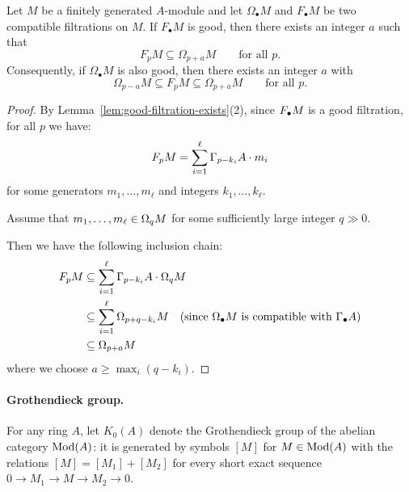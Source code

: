 \begin{corollary}\label{cor:compare-good-filtrations}
    Let $M$ be a finitely generated $A$-module and let $\Omega_\bullet M$ and $F_\bullet M$
    be two compatible filtrations on $M$.
    If $F_\bullet M$ is good, then there exists an integer $a$ such that
    \[
        F_pM \subseteq \Omega_{p+a}M \qquad \text{for all } p.
    \]
    Consequently, if $\Omega_\bullet M$ is also good, then there exists an integer $a$ with
    \[
        \Omega_{p-a}M \subseteq F_pM \subseteq \Omega_{p+a}M \qquad \text{for all } p.
    \]
\end{corollary}
\begin{proof}
    By Lemma~\ref{lem:good-filtration-exists}(2), since $F_{\bullet} M$ is a good filtration, for all $p$ we have:
    \[
        F_{p} M = \sum_{i=1}^{\ell} \Gamma_{p-k_i} A \cdot m_i
    \]
    for some generators $m_1, \dots, m_\ell$ and integers $k_1, \dots, k_\ell$.

    Assume that $m_1, \dots, m_\ell \in \Omega_{q} M$ for some sufficiently large integer $q \gg 0$.

    Then we have the following inclusion chain:
    \begin{align*}
        F_{p} M & \subseteq \sum_{i=1}^{\ell} \Gamma_{p-k_i} A \cdot \Omega_{q} M                                                                    \\
                 & \subseteq \sum_{i=1}^{\ell} \Omega_{p+q-k_i} M \quad (\text{since } \Omega_{\bullet} M \text{ is compatible with } \Gamma_{\bullet} A) \\
                 & \subseteq \Omega_{p+a} M
    \end{align*}
    where we choose $a \ge \max_i(q - k_i)$.
\end{proof}


\paragraph{Grothendieck group.}
For any ring $A$, let $K_0(A)$ denote the Grothendieck group of the abelian
category $\mathrm{Mod}(A)$: it is generated by symbols $[M]$ for $M\in\mathrm{Mod}(A)$ with the
relations $[M]=[M_1]+[M_2]$ for every short exact sequence
$0\to M_1\to M\to M_2\to 0$.

